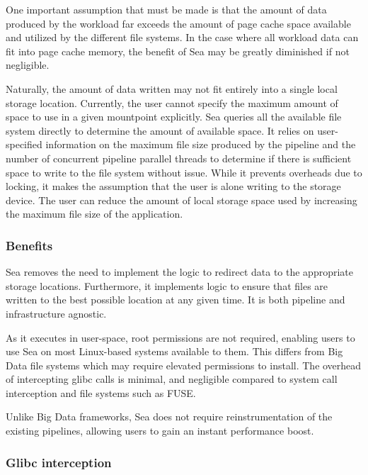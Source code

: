 One important assumption that must be made is that the amount of data produced
by the workload far exceeds the amount of page cache space available and
utilized by the different file systems. In the case where all workload data can
fit into page cache memory, the benefit of Sea may be greatly diminished if not
negligible.

Naturally, the amount of data written may not fit entirely into a single local
storage location. Currently, the user cannot specify the maximum amount of space
to use in a given mountpoint explicitly. Sea queries all the available file
system directly to determine the amount of available space. It relies on
user-specified information on the maximum file size produced by the pipeline and
the number of concurrent pipeline parallel threads to determine if there is
sufficient space to write to the file system without issue. While it prevents
overheads due to locking, it makes the assumption that the user is alone writing
to the storage device. The user can reduce the amount of local storage space
used by increasing the maximum file size of the application.



\subsubsection{Benefits}
Sea removes the need to implement the logic to redirect data to the appropriate
storage locations. Furthermore, it implements logic to ensure that files are
written to the best possible location at any given time. It is both pipeline and
infrastructure agnostic.

As it executes in user-space, root permissions are not required, enabling users
to use Sea on most Linux-based systems available to them. This differs from Big
Data file systems which may require elevated permissions to install. The
overhead of intercepting glibc calls is minimal, and negligible compared to
system call interception and file systems such as FUSE.

Unlike Big Data frameworks, Sea does not require reinstrumentation of the
existing pipelines, allowing users to gain an instant performance boost.

\subsubsection{Glibc interception}

